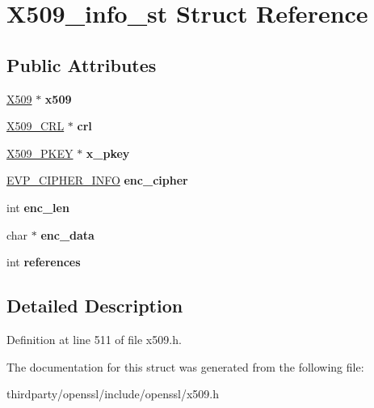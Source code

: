 \hypertarget{struct_x509__info__st}{}\section{X509\+\_\+info\+\_\+st Struct Reference}
\label{struct_x509__info__st}
\subsection*{Public Attributes}
\begin{DoxyCompactItemize}
\item 
\mbox{\label{struct_x509__info__st_ab25bba431636552ba16640f61c42668c}} 
\hyperlink{structx509__st}{X509} $\ast$ {\bfseries x509}
\item 
\mbox{\label{struct_x509__info__st_aaf234a243b1abc907de008a71d984330}} 
\hyperlink{struct_x509__crl__st}{X509\+\_\+\+C\+RL} $\ast$ {\bfseries crl}
\item 
\mbox{\label{struct_x509__info__st_a06456585da668d208076cf6385f177aa}} 
\hyperlink{structprivate__key__st}{X509\+\_\+\+P\+K\+EY} $\ast$ {\bfseries x\+\_\+pkey}
\item 
\mbox{\label{struct_x509__info__st_a157d206dc1a125ab2b4c7d166a7de138}} 
\hyperlink{structevp__cipher__info__st}{E\+V\+P\+\_\+\+C\+I\+P\+H\+E\+R\+\_\+\+I\+N\+FO} {\bfseries enc\+\_\+cipher}
\item 
\mbox{\label{struct_x509__info__st_a8da5cd22fabb3c72738fabac57bbe64f}} 
int {\bfseries enc\+\_\+len}
\item 
\mbox{\label{struct_x509__info__st_a7b4eaab0048c4e7b6d5a3dd9d70be609}} 
char $\ast$ {\bfseries enc\+\_\+data}
\item 
\mbox{\label{struct_x509__info__st_ab5653bf99a3d84cffed5ec7c52da92e3}} 
int {\bfseries references}
\end{DoxyCompactItemize}


\subsection{Detailed Description}


Definition at line 511 of file x509.\+h.



The documentation for this struct was generated from the following file\+:\begin{DoxyCompactItemize}
\item 
thirdparty/openssl/include/openssl/x509.\+h\end{DoxyCompactItemize}
